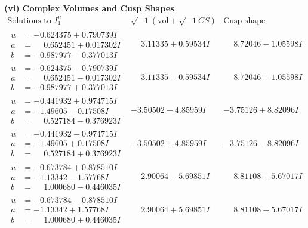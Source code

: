 \documentclass[1p]{elsarticle_modified}
\theoremstyle{definition}
\newcommand{\I}{\sqrt{-1}}
\begin{document}
\newpage\flushleft \textbf{(vi) Complex Volumes and Cusp Shapes}
$$\begin{array}{c|c|c}  
\text{Solutions to }I^u_{1}& \I (\text{vol} + \sqrt{-1}CS) & \text{Cusp shape}\\
 \hline 
\begin{aligned}
u &= -0.624375 + 0.790739 I \\
a &= \phantom{-}0.652451 + 0.017302 I \\
b &= -0.987977 - 0.377013 I\end{aligned}
 & \phantom{-}3.11335 + 0.59534 I & \phantom{-}8.72046 - 1.05598 I \\ \hline\begin{aligned}
u &= -0.624375 - 0.790739 I \\
a &= \phantom{-}0.652451 - 0.017302 I \\
b &= -0.987977 + 0.377013 I\end{aligned}
 & \phantom{-}3.11335 - 0.59534 I & \phantom{-}8.72046 + 1.05598 I \\ \hline\begin{aligned}
u &= -0.441932 + 0.974715 I \\
a &= -1.49605 - 0.17508 I \\
b &= \phantom{-}0.527184 - 0.376923 I\end{aligned}
 & -3.50502 - 4.85959 I & -3.75126 + 8.82096 I \\ \hline\begin{aligned}
u &= -0.441932 - 0.974715 I \\
a &= -1.49605 + 0.17508 I \\
b &= \phantom{-}0.527184 + 0.376923 I\end{aligned}
 & -3.50502 + 4.85959 I & -3.75126 - 8.82096 I \\ \hline\begin{aligned}
u &= -0.673784 + 0.878510 I \\
a &= -1.13342 - 1.57768 I \\
b &= \phantom{-}1.000680 - 0.446035 I\end{aligned}
 & \phantom{-}2.90064 - 5.69851 I & \phantom{-}8.81108 + 5.67017 I \\ \hline\begin{aligned}
u &= -0.673784 - 0.878510 I \\
a &= -1.13342 + 1.57768 I \\
b &= \phantom{-}1.000680 + 0.446035 I\end{aligned}
 & \phantom{-}2.90064 + 5.69851 I & \phantom{-}8.81108 - 5.67017 I \\ \hline\begin{aligned}

\end{aligned}
\end{array}$$
\end{document}
